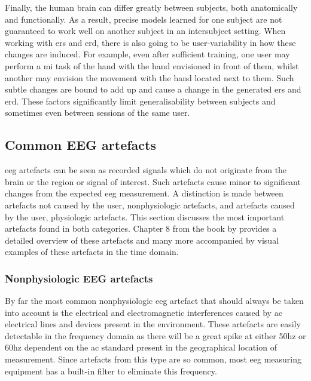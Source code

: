 Finally, the human brain can differ greatly between subjects, both anatomically and functionally.
As a result, precise models learned for one subject are not guaranteed to work well on another subject in an intersubject setting.
When working with \gls{ers} and \gls{erd}, there is also going to be user-variability in how these changes are induced.
For example, even after sufficient training, one user may perform a \gls{mi} task of the hand with the hand envisioned in front of them, whilst another may envision the movement with the hand located next to them.
Such subtle changes are bound to add up and cause a change in the generated \gls{ers} and \gls{erd}.
These factors significantly limit generalisability between subjects and sometimes even between sessions of the same user.





\subsection{Common EEG artefacts}
\label{subsec:biomedical_signals_working_with_eeg_artefacts}

\Gls{eeg} artefacts can be seen as recorded signals which do not originate from the brain or the region or signal of interest.
Such artefacts cause minor to significant changes from the expected \gls{eeg} measurement.
A distinction is made between artefacts not caused by the user, nonphysiologic artefacts, and artefacts caused by the user, physiologic artefacts.
This section discusses the most important artefacts found in both categories.
Chapter 8 from the book by \citet{eeg_artifacts} provides a detailed overview of these artefacts and many more accompanied by visual examples of these artefacts in the time domain.


\subsubsection{Nonphysiologic EEG artefacts}
\label{subsubsec:biomedical_signals_working_with_eeg_artefacts_nonphysiologic}

By far the most common nonphysiologic \gls{eeg} artefact that should always be taken into account is the electrical and electromagnetic interferences caused by \gls{ac} electrical lines and devices present in the environment.
These artefacts are easily detectable in the frequency domain as there will be a great spike at either 50\gls{hz} or 60\gls{hz} dependent on the \gls{ac} standard present in the geographical location of measurement.
Since artefacts from this type are so common, most \gls{eeg} measuring equipment has a built-in filter to eliminate this frequency.

